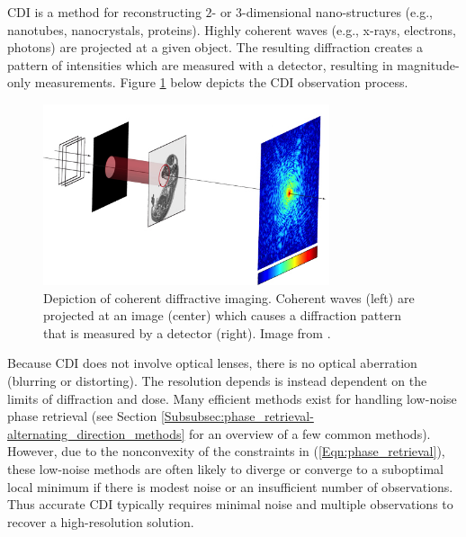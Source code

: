 CDI is a method for reconstructing $2$- or $3$-dimensional nano-structures (e.g., nanotubes, nanocrystals, proteins).  Highly coherent waves (e.g., x-rays, electrons, photons) are projected at a given object.  The resulting diffraction creates a pattern of intensities which are measured with a detector, resulting in magnitude-only measurements.  Figure \ref{Fig:CDI} below depicts the CDI observation process.

\begin{figure}[H]
  \centering
    \includegraphics[width=0.75\textwidth]{phase_retrieval_depiction_mod.jpg}
   \caption{Depiction of coherent diffractive imaging.  Coherent waves (left) are projected at an image (center) which causes a diffraction pattern that is measured by a detector (right). Image from \cite{Guizar-Sicairos}.}
   \label{Fig:CDI}
\end{figure}

Because CDI does not involve optical lenses, there is no optical aberration (blurring or distorting).  The resolution depends is instead dependent on the limits of diffraction and dose.  Many efficient methods exist for handling low-noise phase retrieval (see Section \ref{Subsubsec:phase_retrieval-alternating_direction_methods} for an overview of a few common methods).  However, due to the nonconvexity of the constraints in (\ref{Eqn:phase_retrieval}), these low-noise methods are often likely to diverge or converge to a suboptimal local minimum if there is modest noise or an insufficient number of observations.  Thus accurate CDI typically requires minimal noise and multiple observations to recover a high-resolution solution.




